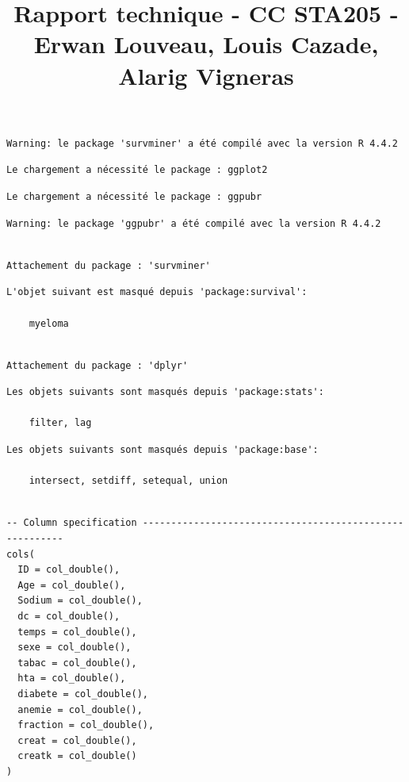 \documentclass[
  letterpaper,
  DIV=11,
  numbers=noendperiod]{scrartcl}
\title{Rapport technique - CC STA205 - Erwan Louveau, Louis Cazade,
Alarig Vigneras}
\author{}
\date{}
\begin{document}
\maketitle


\begin{verbatim}
Warning: le package 'survminer' a été compilé avec la version R 4.4.2
\end{verbatim}

\begin{verbatim}
Le chargement a nécessité le package : ggplot2
\end{verbatim}

\begin{verbatim}
Le chargement a nécessité le package : ggpubr
\end{verbatim}

\begin{verbatim}
Warning: le package 'ggpubr' a été compilé avec la version R 4.4.2
\end{verbatim}

\begin{verbatim}

Attachement du package : 'survminer'
\end{verbatim}

\begin{verbatim}
L'objet suivant est masqué depuis 'package:survival':

    myeloma
\end{verbatim}

\begin{verbatim}

Attachement du package : 'dplyr'
\end{verbatim}

\begin{verbatim}
Les objets suivants sont masqués depuis 'package:stats':

    filter, lag
\end{verbatim}

\begin{verbatim}
Les objets suivants sont masqués depuis 'package:base':

    intersect, setdiff, setequal, union
\end{verbatim}

\begin{verbatim}

-- Column specification --------------------------------------------------------
cols(
  ID = col_double(),
  Age = col_double(),
  Sodium = col_double(),
  dc = col_double(),
  temps = col_double(),
  sexe = col_double(),
  tabac = col_double(),
  hta = col_double(),
  diabete = col_double(),
  anemie = col_double(),
  fraction = col_double(),
  creat = col_double(),
  creatk = col_double()
)
\end{verbatim}
\end{document}
